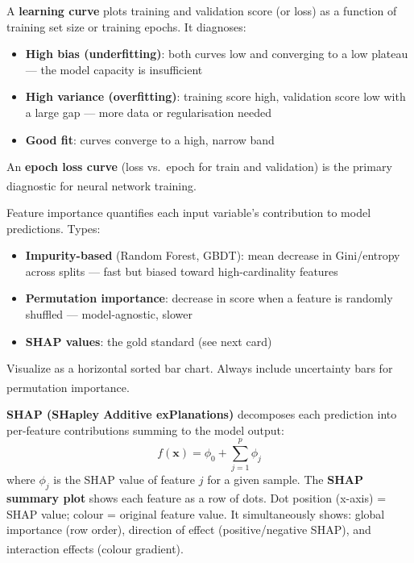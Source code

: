 \begin{tcbitemize}[ skin=sectionraster ]
    \tcbitem[title={Learning Curves}, raster multicolumn=3]
    A \textbf{learning curve} plots training and validation score (or loss) as a
    function of training set size or training epochs. It diagnoses:
    \begin{itemize}
        \item \textbf{High bias (underfitting)}: both curves low and converging to a low
              plateau --- the model capacity is insufficient
        \item \textbf{High variance (overfitting)}: training score high, validation score
              low with a large gap --- more data or regularisation needed
        \item \textbf{Good fit}: curves converge to a high, narrow band
    \end{itemize}
    An \textbf{epoch loss curve} (loss vs.\ epoch for train and validation) is the primary
    diagnostic for neural network
    training\textsuperscript{\cite[][pp.~200--210]{raschkaPythonMachineLearning2015}}.

    \tcbitem[title={Feature Importance Plots}, raster multicolumn=3]
    Feature importance quantifies each input variable's contribution to model predictions.
    Types:
    \begin{itemize}
        \item \textbf{Impurity-based} (Random Forest, GBDT): mean decrease in Gini/entropy
              across splits --- fast but biased toward high-cardinality features
        \item \textbf{Permutation importance}: decrease in score when a feature is randomly
              shuffled --- model-agnostic, slower
        \item \textbf{SHAP values}: the gold standard (see next card)
    \end{itemize}
    Visualize as a horizontal sorted bar chart. Always include uncertainty bars for
    permutation
    importance\textsuperscript{\cite[][pp.~215--220]{raschkaPythonMachineLearning2015}}.

    \tcbitem[title={SHAP Summary Plots}, raster multicolumn=3]
    \textbf{SHAP (SHapley Additive exPlanations)} decomposes each prediction into
    per-feature contributions summing to the model output:
    \begin{equation}
        f(\mathbf{x}) = \phi_0 + \sum_{j=1}^{p} \phi_j
    \end{equation}
    where $\phi_j$ is the SHAP value of feature $j$ for a given sample.
    The \textbf{SHAP summary plot} shows each feature as a row of dots. Dot position
    (x-axis) = SHAP value; colour = original feature value. It simultaneously shows:
    global importance (row order), direction of effect (positive/negative SHAP),
    and interaction effects (colour
    gradient)\textsuperscript{\cite[][pp.~220--230]{raschkaPythonMachineLearning2015}}.


\end{tcbitemize}
